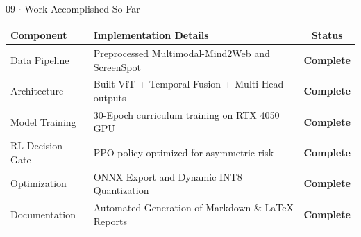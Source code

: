 \documentclass[aspectratio=169, 10pt]{beamer}
\begin{document}
\begin{frame}{09 $\cdot$ Work Accomplished So Far}

    \begin{table}[]

        \centering
        \small

        \begin{tabularx}{\textwidth}{l X c}

            \toprule
            \textbf{Component} &
            \textbf{Implementation Details} &
            \textbf{Status} \\

            \midrule

            Data Pipeline &
            Preprocessed Multimodal-Mind2Web and ScreenSpot &
            \textbf{\color{successgreen}Complete} \\

            Architecture &
            Built ViT + Temporal Fusion + Multi-Head outputs &
            \textbf{\color{successgreen}Complete} \\

            Model Training &
            30-Epoch curriculum training on RTX 4050 GPU &
            \textbf{\color{successgreen}Complete} \\

            RL Decision Gate &
            PPO policy optimized for asymmetric risk &
            \textbf{\color{successgreen}Complete} \\

            Optimization &
            ONNX Export and Dynamic INT8 Quantization &
            \textbf{\color{successgreen}Complete} \\

            Documentation &
            Automated Generation of Markdown \& LaTeX Reports &
            \textbf{\color{successgreen}Complete} \\

            \bottomrule

        \end{tabularx}

    \end{table}

\end{frame}

\end{document}

